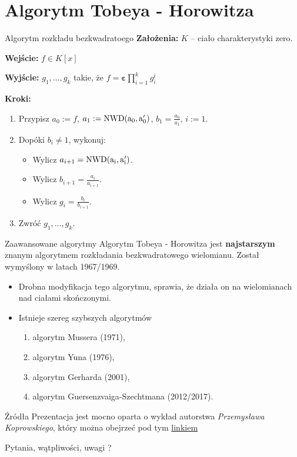 \documentclass{beamer}
\newcommand{\NWD}{\rm{NWD}}
\renewcommand{\epsilon}{\bm{\varepsilon}}
\begin{document}
\section{Algorytm Tobeya - Horowitza}
\begin{frame}{Algorytm rozkładu bezkwadratoego}
    \textbf{Założenia:} $K$ -- ciało charakterystyki zero. 

    \textbf{Wejście:} $f \in K[x]$

    \textbf{Wyjście:} $g_1,\ldots, g_k$ takie, że $f = \epsilon \prod_{i=1}^{k}g_i^i$
    
    \textbf{Kroki:}
    \begin{enumerate}
        \item Przypisz $a_0 := f$, $a_1 := \NWD(a_0, a_0')$, $b_1 = \frac{a_0}{a_1}$, $i:=1$. 
        \item Dopóki $b_i \neq 1$, wykonuj:
        \begin{itemize}
            \item Wylicz $a_{i+1} = \NWD(a_i, a_i')$.
            \item Wylicz $b_{i+1} = \frac{a_{i}}{a_{i+1}}$.
            \item Wylicz $g_i = \frac{b_i}{b_{i+1}}$.
        \end{itemize}
        \item Zwróć $g_1, \ldots, g_k$. 
    \end{enumerate}
\end{frame}

\begin{frame}{Zaawansowane algorytmy}
    Algorytm Tobeya - Horowitza jest \textbf{najstarszym} znanym algorytmem rozkładania bezkwadratowego wielomianu.
    Został wymyślony w latach 1967/1969. 
    \pause 
    \begin{itemize}
        \item Drobna modyfikacja tego algorytmu, sprawia, że działa on na wielomianach nad ciałami skończonymi. 
        \pause \item Istnieje szereg szybszych algorytmów \begin{enumerate}
            \item algorytm Mussera (1971),
            \item algorytm Yuna (1976),
            \item algorytm Gerharda (2001),
            \item algorytm Guersenzvaiga-Szechtmana (2012/2017).
        \end{enumerate}
    \end{itemize}
\end{frame}
\begin{frame}{Źródła}
    Prezentacja jest mocno oparta o wykład autorstwa \textit{Przemysława Koprowskiego}, który można obejrzeć pod tym 
    \href{https://www.youtube.com/watch?v=x8AMniwrD4s&t=3373s}{linkiem}
    \printbibliography
\end{frame}

\begin{frame}
    \centering 
    \LARGE Pytania, wątpliwości, uwagi ? 
\end{frame}
\end{document}
